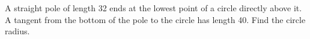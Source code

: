 A straight pole of length 32 ends at the lowest point of a circle directly above it. A tangent from the bottom of the pole to the circle has length 40. Find the circle radius.
